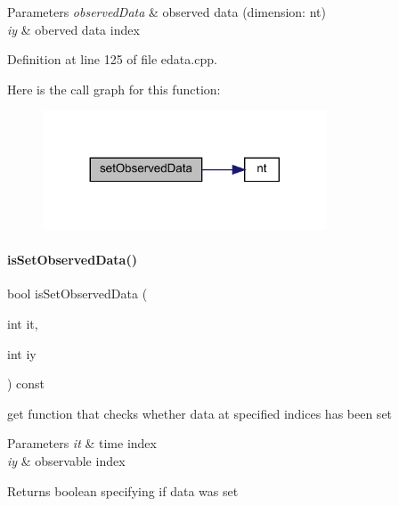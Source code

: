 \begin{DoxyParams}{Parameters}
{\em observed\+Data} & observed data (dimension\+: nt) \\
\hline
{\em iy} & oberved data index \\
\hline
\end{DoxyParams}


Definition at line 125 of file edata.\+cpp.

Here is the call graph for this function\+:
\nopagebreak
\begin{figure}[H]
\begin{center}
\leavevmode
\includegraphics[width=239pt]{classamici_1_1_exp_data_a814827d61da6c675276758c856faf794_cgraph}
\end{center}
\end{figure}
\mbox{\label{classamici_1_1_exp_data_aedcda756b6356d6e147f2f4eb7658500}} 
\paragraph{\texorpdfstring{isSetObservedData()}{isSetObservedData()}}
{\footnotesize\ttfamily bool is\+Set\+Observed\+Data (\begin{DoxyParamCaption}\item[{int}]{it,  }\item[{int}]{iy }\end{DoxyParamCaption}) const}

get function that checks whether data at specified indices has been set


\begin{DoxyParams}{Parameters}
{\em it} & time index \\
\hline
{\em iy} & observable index \\
\hline
\end{DoxyParams}
\begin{DoxyReturn}{Returns}
boolean specifying if data was set 
\end{DoxyReturn}


